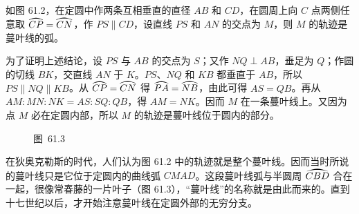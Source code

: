 如图 61.2，在定圆中作两条互相垂直的直径 $AB$ 和 $CD$，在圆周上向 $C$ 点两侧任意取 $\arc{CP}=\arc{CN}$，作 $PS\parallel CD$，设直线 $PS$ 和 $AN$ 的交点为 $M$，则 $M$ 的轨迹是蔓叶线的弧。

为了证明上述结论，设 $PS$ 与 $AB$ 的交点为 $S$；又作 $NQ\perp AB$，垂足为 $Q$；作圆的切线 $BK$，交直线 $AN$ 于 $K$。$PS$、$NQ$ 和 $KB$ 都垂直于 $AB$，所以 $PS\parallel NQ\parallel KB$。从 $\arc{CP}=\arc{CN}$ 得 $\arc{PA}=\arc{NB}$，由此可得 $AS=QB$。再从 $AM:MN:NK=AS:SQ:QB$，得 $AM=NK$。因而 $M$ 在一条蔓叶线上。又因为点 $M$ 必在定圆内部，所以 $M$ 的轨迹是蔓叶线位于圆内的部分。

\begin{figure}
  \centering
  \vspace{-4pt}
  \caption*{图\ 61.3}
\end{figure}

在狄奥克勒斯的时代，人们认为图 61.2 中的轨迹就是整个蔓叶线。因而当时所说的蔓叶线只是它位于定圆内的曲线弧 $CMAD$。这段蔓叶线弧与半圆周 $\arc{CBD}$ 合在一起，很像常春藤的一片叶子（图 61.3），“蔓叶线”的名称就是由此而来的。直到十七世纪以后，才开始注意蔓叶线在定圆外部的无穷分支。
